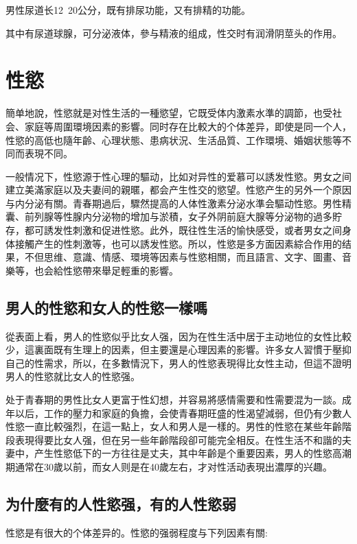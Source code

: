 \documentclass[12pt,UTF8]{ctexbook}
\begin{document}
男性尿道长12~20公分，既有排尿功能，又有排精的功能。

其中有尿道球腺，可分泌液体，參与精液的组成，性交时有润滑阴莖头的作用。

\chapter{性慾}

簡单地說，性慾就是对性生活的一種慾望，它既受体内激素水準的調節，也受社会、家庭等周圍環境因素的影響。同时存在比較大的个体差异，即使是同一个人，性慾的高低也隨年齡、心理状態、患病状況、生活品質、工作環境、婚姻状態等不同而表現不同。

一般情况下，性慾源于性心理的驅动，比如对异性的爱慕可以誘发性慾。男女之间建立美滿家庭以及夫妻间的親暱，都会产生性交的慾望。性慾产生的另外一个原因与内分泌有關。青春期過后，驟然提高的人体性激素分泌水準会驅动性慾。男性精囊、前列腺等性腺内分泌物的增加与淤積，女子外阴前庭大腺等分泌物的過多貯存，都可誘发性刺激和促进性慾。此外，既往性生活的愉快感受，或者男女之间身体接觸产生的性刺激等，也可以誘发性慾。所以，性慾是多方面因素綜合作用的结果，不但思维、意識、情感、環境等因素与性慾相關，而且語言、文字、圖畫、音樂等，也会給性慾帶來舉足輕重的影響。

\section{男人的性慾和女人的性慾一樣嗎}

從表面上看，男人的性慾似乎比女人强，因为在性生活中居于主动地位的女性比較少，這裏面既有生理上的因素，但主要還是心理因素的影響。许多女人習慣于壓抑自己的性需求，所以，在多數情況下，男人的性慾表現得比女性主动，但這不證明男人的性慾就比女人的性慾强。

处于青春期的男性比女人更富于性幻想，并容易將感情需要和性需要混为一談。成年以后，工作的壓力和家庭的負擔，会使青春期旺盛的性渴望減弱，但仍有少數人性慾一直比較强烈，在這一點上，女人和男人是一樣的。男性的性慾在某些年齡階段表現得要比女人强，但在另一些年齡階段卻可能完全相反。在性生活不和諧的夫妻中，产生性慾低下的一方往往是丈夫，其中年齡是个重要因素，男人的性慾高潮期通常在30歲以前，而女人则是在40歲左右，才对性活动表現出濃厚的兴趣。

\section{为什麼有的人性慾强，有的人性慾弱}

性慾是有很大的个体差异的。性慾的强弱程度与下列因素有關:
\end{document}
